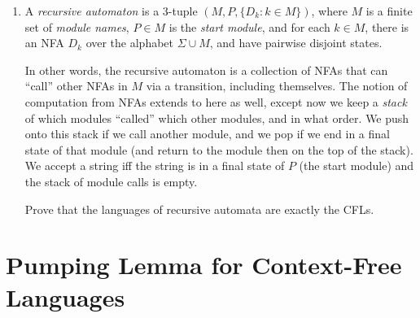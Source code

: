 \begin{enumerate}[resume]
\item {} A \emph{recursive automaton} is a 3-tuple $(M, P, \{D_k : k \in M \})$, where $M$ is a finite set of \emph{module names}, $P \in M$ is the \emph{start module}, and for each $k \in M$, there is an NFA $D_k$ over the alphabet $\Sigma \cup M$, and have pairwise disjoint states. 

In other words, the recursive automaton is a collection of NFAs that can ``call'' other NFAs in $M$ via a transition, including themselves. 
The notion of computation from NFAs extends to here as well, except now we keep a \emph{stack} of which modules ``called'' which other modules, and in what order. 
We push onto this stack if we call another module, and we pop if we end in a final state of that module (and return to the module then on the top of the stack).
We accept a string iff the string is in a final state of $P$ (the start module) and the stack of module calls is empty.
		
Prove that the languages of recursive automata are exactly the CFLs.
\end{enumerate}

\section{Pumping Lemma for Context-Free Languages}

